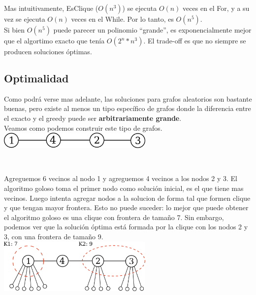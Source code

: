 Mas intuitivamente, EsClique ($O(n^3)$) se ejecuta $O(n)$ veces en el For, y a su vez se ejecuta $O(n)$ veces en el While. Por lo tanto, es $O(n^5)$. \\

Si bien $O(n^5)$ puede parecer un polinomio ``grande'', es exponencialmente mejor que el algortimo exacto que tenía $O(2^{n} * n^{3})$. El trade-off es que no siempre se producen soluciones óptimas. \\

\subsection{Optimalidad}

Como podrá verse mas adelante, las soluciones para grafos aleatorios son bastante buenas, pero existe al menos un tipo específico de grafos donde la diferencia entre el exacto y el greedy puede ser \textbf{arbitrariamente grande}. \\

Veamos como podemos construir este tipo de grafos. \\

{\centering
    \includegraphics[width=0.57\textwidth]{informe/imgs/greedy_base.png} \\
}

$ $\newline

Agreguemos 6 vecinos al nodo 1 y agreguemos 4 vecinos a los nodos 2 y 3. El algoritmo goloso toma el primer nodo como solución inicial, es el que tiene mas vecinos. Luego intenta agregar nodos a la solucion de forma tal que formen clique y que tengan mayor frontera. Esto no puede suceder: lo mejor que puede obtener el algoritmo goloso es una clique con frontera de tamaño 7. Sin embargo, podemos ver que la solución óptima está formada por la clique con los nodos 2 y 3, con una frontera de tamaño 9.\\

{\centering
    \includegraphics[width=0.57\textwidth]{informe/imgs/greedy_base_nodes_v1.png} \\
}
$ $\newline

